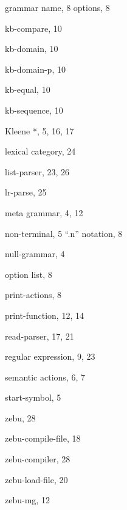 \begin{theindex}
  \indexspace

  \item grammar 
    \subitem name, 8
    \subitem options, 8

  \indexspace

  \item kb-compare, 10
  \item kb-domain, 10
  \item kb-domain-p, 10
  \item kb-equal, 10
  \item kb-sequence, 10
  \item Kleene *, 5, 16, 17

  \indexspace

  \item lexical category, 24
  \item list-parser, 23, 26
  \item lr-parse, 25

  \indexspace

  \item meta grammar, 4, 12

  \indexspace

  \item non-terminal, 5
    \subitem ``.n'' notation, 8
  \item null-grammar, 4

  \indexspace

  \item option list, 8

  \indexspace

  \item print-actions, 8
  \item print-function, 12, 14

  \indexspace

  \item read-parser, 17, 21
  \item regular expression, 9, 23

  \indexspace

  \item semantic actions, 6, 7
  \item start-symbol, 5

  \indexspace

  \item zebu, 28
  \item zebu-compile-file, 18
  \item zebu-compiler, 28
  \item zebu-load-file, 20
  \item zebu-mg, 12

%
\end{theindex}



